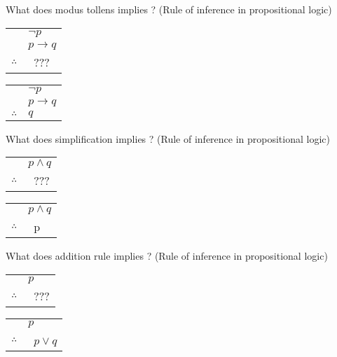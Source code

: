 \documentclass[12pt]{article}
\newcommand*{\xfield}[1]{\begin{mdframed}\centering #1\end{mdframed}\bigskip}
\newenvironment{note}{}{}
\begin{document}
\begin{note}
    \xfield{What does modus tollens implies ? (Rule of inference in propositional logic) \begin{tabular}{c@{\,}l@{}}                          & $\neg p$ \\& $p \to q$ \\\cline{2-2}    $\therefore$         & \ ??? \\  \end{tabular}}
    \xfield{
        \begin{tabular}{c@{\,}l@{}} 
                                 & $\neg p$ \\
        & $p \to q$ \\\cline{2-2}
            $\therefore$         & $q$ \\  \end{tabular}
    }
\end{note}

\begin{note}
    \xfield{What does simplification implies ? (Rule of inference in propositional logic) \begin{tabular}{c@{\,}l@{}} & $p \wedge q$ \\\cline{2-2}    $\therefore$         & \ ??? \\  \end{tabular}}
    \xfield{
        \begin{tabular}{c@{\,}l@{}}         
        & $p \wedge q$ \\\cline{2-2}
            $\therefore$         & \ p \\  \end{tabular}
    }
\end{note}

\begin{note}
    \xfield{What does addition rule implies ? (Rule of inference in propositional logic) \begin{tabular}{c@{\,}l@{}} & $p$ \\\cline{2-2}    $\therefore$         & \ ??? \\  \end{tabular}}
    \xfield{
        \begin{tabular}{c@{\,}l@{}} 
        & $p$ \\\cline{2-2}
            $\therefore$         & \ $p \vee q$ \\  \end{tabular}
    }
\end{note}
\end{document}
